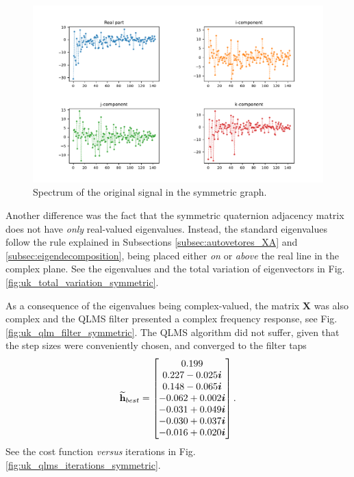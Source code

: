 \begin{figure}
\centering
\includegraphics[width=\linewidth]{thesis/Figures/uk_example/uk_spectrum_symmetric.pdf}
\caption{Spectrum of the original signal in the symmetric graph.}
\label{fig:uk_spectrum_symmetric}
\end{figure}

Another difference was the fact that the symmetric quaternion adjacency matrix does not have \textit{only} real-valued eigenvalues. Instead, the standard eigenvalues follow the rule explained in Subsections \ref{subsec:autovetores_XA} and \ref{subsec:eigendecomposition}, being placed either \textit{on} or \textit{above} the real line in the complex plane. See the eigenvalues and the total variation of eigenvectors in Fig. \ref{fig:uk_total_variation_symmetric}.

As a consequence of the eigenvalues being complex-valued, the matrix $\mathbf{X}$ was also complex and the QLMS filter presented a complex frequency response, see Fig. \ref{fig:uk_qlm_filter_symmetric}.
The QLMS algorithm did not suffer, given that the step sizes were conveniently chosen, and converged to the filter taps
\begin{equation}
\mathbf{\widetilde{h}}_{best} = 
\begin{bmatrix}
0.199 \\
0.227 -0.025\boldsymbol{i} \\
0.148 -0.065 \boldsymbol{i} \\
-0.062 + 0.002 \boldsymbol{i} \\
-0.031 + 0.049 \boldsymbol{i} \\
-0.030 + 0.037 \boldsymbol{i} \\
-0.016 + 0.020 \boldsymbol{i}
\end{bmatrix}.
\end{equation}
See the cost function \textit{versus} iterations in Fig. \ref{fig:uk_qlms_iterations_symmetric}.

